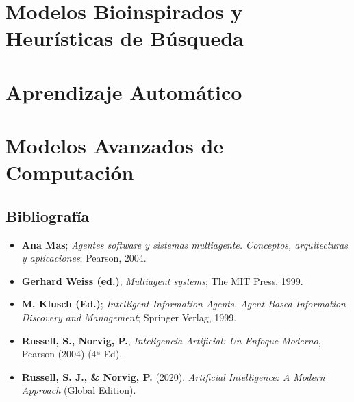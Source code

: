 \documentclass[11pt, a4paper]{report}
\begin{document}
\part{Modelos Bioinspirados y Heurísticas de Búsqueda}


\part{Aprendizaje Automático}


\part{Modelos Avanzados de Computación}





\nocite{*}
\newpage

\chapter*{Bibliografía}

\begin{itemize}
    \item \textbf{Ana Mas}; \textit{Agentes software y sistemas multiagente. Conceptos, arquitecturas y aplicaciones}; Pearson, 2004.
    \item \textbf{Gerhard Weiss (ed.)}; \textit{Multiagent systems}; The MIT Press, 1999.
    \item \textbf{M. Klusch (Ed.)}; \textit{Intelligent Information Agents. Agent-Based Information Discovery and Management}; Springer Verlag, 1999.
    \item \textbf{Russell, S., Norvig, P.}, \textit{Inteligencia Artificial: Un Enfoque Moderno}, Pearson (2004) (4ª Ed).
    \item \textbf{Russell, S. J., \& Norvig, P.} (2020). \textit{Artificial Intelligence: A Modern Approach} (Global Edition).
\end{itemize}
\end{document}
